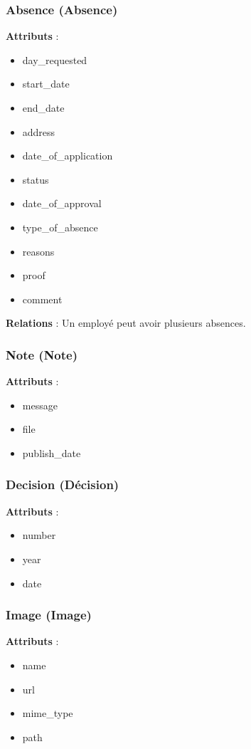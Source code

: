 \subsubsection{Absence (Absence)}
\textbf{Attributs} :
\begin{itemize}
    \item day\_requested
    \item start\_date
    \item end\_date
    \item address
    \item date\_of\_application
    \item status
    \item date\_of\_approval
    \item type\_of\_absence
    \item reasons
    \item proof
    \item comment
\end{itemize}
\textbf{Relations} : Un employé peut avoir plusieurs absences.

\subsubsection{Note (Note)}
\textbf{Attributs} :
\begin{itemize}
    \item message
    \item file
    \item publish\_date
\end{itemize}

\subsubsection{Decision (Décision)}
\textbf{Attributs} :
\begin{itemize}
    \item number
    \item year
    \item date
\end{itemize}

\subsubsection{Image (Image)}
\textbf{Attributs} :
\begin{itemize}
    \item name
    \item url
    \item mime\_type
    \item path
\end{itemize}















